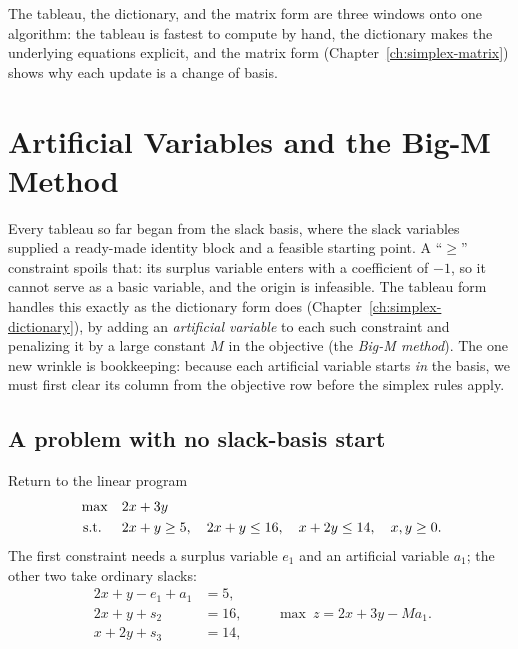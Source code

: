 The tableau, the dictionary, and the matrix form are three windows onto one algorithm: the tableau is fastest to compute by hand, the dictionary makes the underlying equations explicit, and the matrix form (Chapter~\ref{ch:simplex-matrix}) shows why each update is a change of basis.

\section{Artificial Variables and the Big-M Method}
\label{sec:tableau-bigm}

Every tableau so far began from the slack basis, where the slack variables supplied a ready-made identity block and a feasible starting point. A ``$\ge$'' constraint spoils that: its surplus variable enters with a coefficient of $-1$, so it cannot serve as a basic variable, and the origin is infeasible. The tableau form handles this exactly as the dictionary form does (Chapter~\ref{ch:simplex-dictionary}), by adding an \emph{artificial variable} to each such constraint and penalizing it by a large constant $M$ in the objective (the \emph{Big-M method}). The one new wrinkle is bookkeeping: because each artificial variable starts \emph{in} the basis, we must first clear its column from the objective row before the simplex rules apply.

\subsection{A problem with no slack-basis start}

Return to the linear program
\[
\begin{aligned}
\max\quad & 2x + 3y \\
\text{ s.t. }\quad & 2x + y \geq 5,\quad 2x + y \leq 16,\quad x + 2y \leq 14,\quad x,y\ge 0.
\end{aligned}
\]
The first constraint needs a surplus variable $e_1$ and an artificial variable $a_1$; the other two take ordinary slacks:
\[
\begin{aligned}
2x + y - e_1 + a_1 &= 5,\\
2x + y + s_2 &= 16,\\
x + 2y + s_3 &= 14,
\end{aligned}
\qquad
\max\ z = 2x + 3y - M a_1 .
\]

